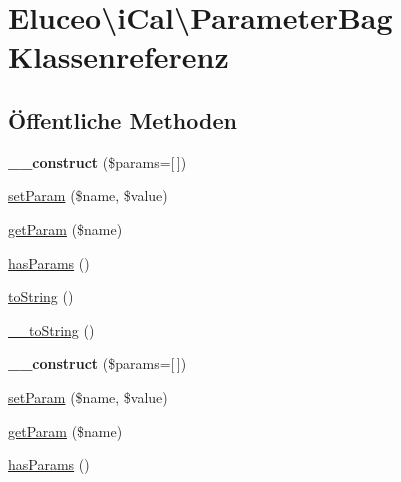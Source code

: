 \hypertarget{class_eluceo_1_1i_cal_1_1_parameter_bag}{}\section{Eluceo\textbackslash{}i\+Cal\textbackslash{}Parameter\+Bag Klassenreferenz}
\label{class_eluceo_1_1i_cal_1_1_parameter_bag}
\subsection*{Öffentliche Methoden}
\begin{DoxyCompactItemize}
\item 
\mbox{\label{class_eluceo_1_1i_cal_1_1_parameter_bag_a3869e226ebd229897354d1d70437e2e3}} 
{\bfseries \+\_\+\+\_\+construct} (\$params=\mbox{[}$\,$\mbox{]})
\item 
\mbox{\hyperlink{class_eluceo_1_1i_cal_1_1_parameter_bag_ac29f2bbb42fdbc435df23623ea5779cd}{set\+Param}} (\$name, \$value)
\item 
\mbox{\hyperlink{class_eluceo_1_1i_cal_1_1_parameter_bag_add3451bf728adf15b29f69a51b2bff08}{get\+Param}} (\$name)
\item 
\mbox{\hyperlink{class_eluceo_1_1i_cal_1_1_parameter_bag_aac985af3f6bb8a95591a6d6b553260ef}{has\+Params}} ()
\item 
\mbox{\hyperlink{class_eluceo_1_1i_cal_1_1_parameter_bag_a3dbe3cb1bc77cd42647b9c3b9cc1cd74}{to\+String}} ()
\item 
\mbox{\hyperlink{class_eluceo_1_1i_cal_1_1_parameter_bag_ad6ae633e87f62df95793c0b3bad3f2b6}{\+\_\+\+\_\+to\+String}} ()
\item 
\mbox{\label{class_eluceo_1_1i_cal_1_1_parameter_bag_a3869e226ebd229897354d1d70437e2e3}} 
{\bfseries \+\_\+\+\_\+construct} (\$params=\mbox{[}$\,$\mbox{]})
\item 
\mbox{\hyperlink{class_eluceo_1_1i_cal_1_1_parameter_bag_ac29f2bbb42fdbc435df23623ea5779cd}{set\+Param}} (\$name, \$value)
\item 
\mbox{\hyperlink{class_eluceo_1_1i_cal_1_1_parameter_bag_add3451bf728adf15b29f69a51b2bff08}{get\+Param}} (\$name)
\item 
\mbox{\hyperlink{class_eluceo_1_1i_cal_1_1_parameter_bag_aac985af3f6bb8a95591a6d6b553260ef}{has\+Params}} ()

\end{DoxyCompactItemize}
